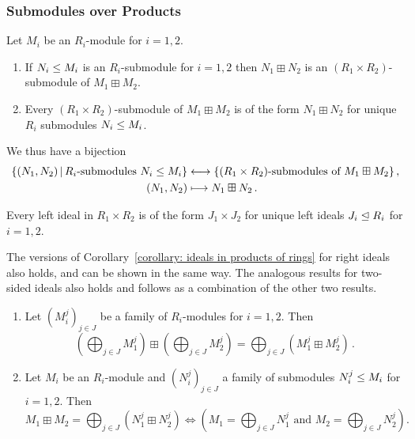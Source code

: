 \subsubsection{Submodules over Products}


\begin{proposition}
  \label{proposition: submodules of products over rings}
  Let $M_i$ be an $R_i$-module for $i = 1, 2$.
  \begin{enumerate}
    \item
      If $N_i \leq M_i$ is an $R_i$-submodule for $i = 1, 2$ then $N_1 \boxplus N_2$ is an $(R_1 \times R_2)$-submodule of $M_1 \boxplus M_2$.
    \item
      Every $(R_1 \times R_2)$-submodule of $M_1 \boxplus M_2$ is of the form $N_1 \boxplus N_2$ for unique $R_i$ submodules $N_i \leq M_i$.
  \end{enumerate}
  We thus have a bijection
  \begin{align*}
    \{ (N_1, N_2) \suchthat \text{$R_i$-submodules $N_i \moduleleq M_i$} \}
    &\longleftrightarrow
    \{ \text{$(R_1 \times R_2)$-submodules of $M_1 \boxplus M_2$} \} \,,
    \\
    (N_1, N_2)
    &\longmapsto
    N_1 \boxplus N_2 \,.
  \end{align*}
\end{proposition}


\begin{corollary}
  \label{corollary: ideals in products of rings}
  Every left ideal in $R_1 \times R_2$ is of the form $J_1 \times J_2$ for unique left ideals $J_i \trianglelefteq R_i$ for $i = 1, 2$.
\end{corollary}


\begin{remark}
  The versions of Corollary~\ref{corollary: ideals in products of rings} for right ideals also holds, and can be shown in the same way.
  The analogous results for two-sided ideals also holds and follows as a combination of the other two results.
\end{remark}


\begin{lemma}
  \leavevmode
  \begin{enumerate}
    \item
      Let $(M^j_i)_{j \in J}$ be a family of $R_i$-modules for $i = 1, 2$.
      Then
      \[
            \left( \bigoplus_{j \in J} M^j_1 \right) \boxplus \left( \bigoplus_{j \in J} M^j_2 \right)
          = \bigoplus_{j \in J} (M^j_1 \boxplus M^j_2) \,.
      \]
    \item
      Let $M_i$ be an $R_i$-module and $(N^j_i)_{j \in J}$ a family of submodules $N^j_i \leq M_i$ for $i = 1, 2$.
      Then
      \[
              M_1 \boxplus M_2 = \bigoplus_{j \in J} \left( N^j_1 \boxplus N^j_2 \right)
        \iff  \left(
                \text{$M_1  = \bigoplus_{j \in J} N^j_1$ and $M_2  = \bigoplus_{j \in J} N^j_2$}
              \right).
      \]
  \end{enumerate}
\end{lemma}


